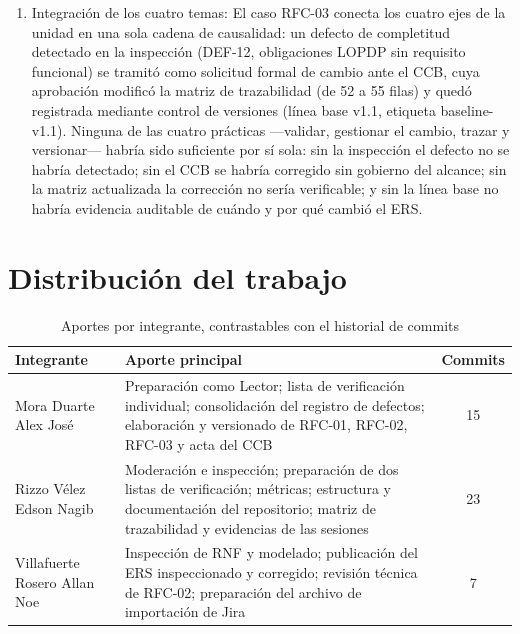 \documentclass[11pt,letterpaper]{article}
\begin{document}
\begin{enumerate}[leftmargin=*]
  \item {Integración de los cuatro temas: El caso RFC-03 conecta los cuatro ejes de la unidad en una sola cadena de causalidad: un defecto de completitud detectado en la inspección (DEF-12, obligaciones LOPDP sin requisito funcional) se tramitó como solicitud formal de cambio ante el CCB, cuya aprobación modificó la matriz de trazabilidad (de 52 a 55 filas) y quedó registrada mediante control de versiones (línea base v1.1, etiqueta baseline-v1.1). Ninguna de las cuatro prácticas —validar, gestionar el cambio, trazar y versionar— habría sido suficiente por sí sola: sin la inspección el defecto no se habría detectado; sin el CCB se habría corregido sin gobierno del alcance; sin la matriz actualizada la corrección no sería verificable; y sin la línea base no habría evidencia auditable de cuándo y por qué cambió el ERS.}
\end{enumerate}

\section{Distribución del trabajo}

\begin{table}[H]
\centering
\caption{Aportes por integrante, contrastables con el historial de commits}
\begin{tabular}{L{4.5cm} L{7cm} c}
\toprule
\textbf{Integrante} & \textbf{Aporte principal} & \textbf{Commits}\\
\midrule
Mora Duarte Alex José & Preparación como Lector; lista de verificación individual; consolidación del registro de defectos; elaboración y versionado de RFC-01, RFC-02, RFC-03 y acta del CCB & 15\\
Rizzo Vélez Edson Nagib & Moderación e inspección; preparación de dos listas de verificación; métricas; estructura y documentación del repositorio; matriz de trazabilidad y evidencias de las sesiones & 23\\
Villafuerte Rosero Allan Noe & Inspección de RNF y modelado; publicación del ERS inspeccionado y corregido; revisión técnica de RFC-02; preparación del archivo de importación de Jira & 7\\
\bottomrule
\end{tabular}
\end{table}

\newpage

\end{document}
